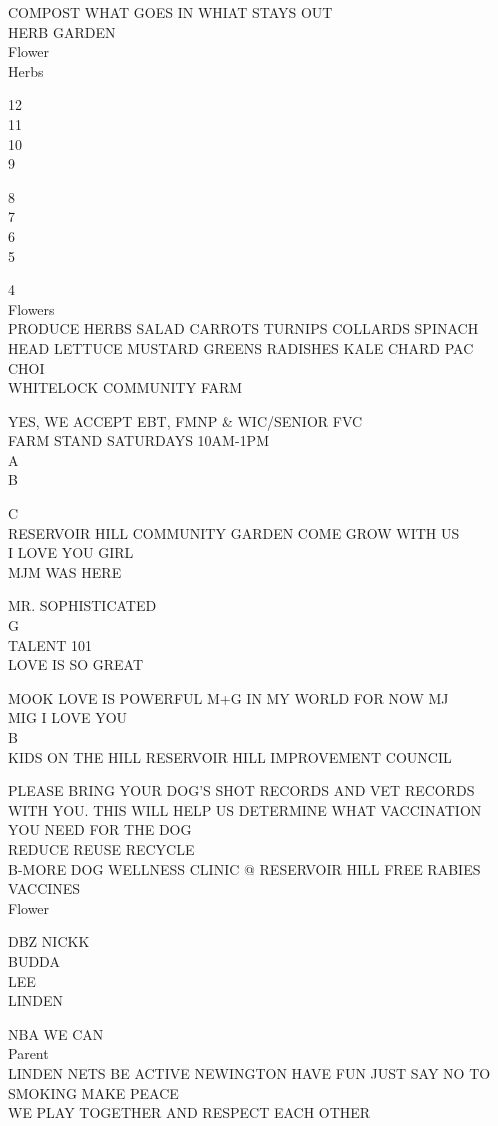 \documentclass[10pt,letterpaper]{article}
\begin{document}
COMPOST WHAT GOES IN WHIAT STAYS OUT\\
HERB GARDEN\\
Flower\\
Herbs

12\\
11\\
10\\
9

8\\
7\\
6\\
5

4\\
Flowers\\
PRODUCE HERBS SALAD CARROTS TURNIPS COLLARDS SPINACH HEAD LETTUCE MUSTARD GREENS RADISHES KALE CHARD PAC CHOI\\
WHITELOCK COMMUNITY FARM

YES, WE ACCEPT EBT, FMNP \& WIC/SENIOR FVC\\
FARM STAND SATURDAYS 10AM{-}1PM\\
A\\
B

C\\
RESERVOIR HILL COMMUNITY GARDEN COME GROW WITH US\\
I LOVE YOU GIRL\\
MJM WAS HERE

MR. SOPHISTICATED\\
G\\
TALENT 101\\
LOVE IS SO GREAT

MOOK LOVE IS POWERFUL M+G IN MY WORLD FOR NOW MJ\\
MIG I LOVE YOU\\
B\\
KIDS ON THE HILL RESERVOIR HILL IMPROVEMENT COUNCIL

PLEASE BRING YOUR DOG'S SHOT RECORDS AND VET RECORDS WITH YOU.  THIS WILL HELP US DETERMINE WHAT VACCINATION YOU NEED FOR THE DOG\\
REDUCE REUSE RECYCLE\\
B{-}MORE DOG WELLNESS CLINIC @ RESERVOIR HILL FREE RABIES VACCINES\\
Flower

DBZ NICKK\\
BUDDA\\
LEE\\
LINDEN

NBA WE CAN\\
Parent\\
LINDEN NETS BE ACTIVE NEWINGTON HAVE FUN JUST SAY NO TO SMOKING MAKE PEACE\\
WE PLAY TOGETHER AND RESPECT EACH OTHER
\end{document}
